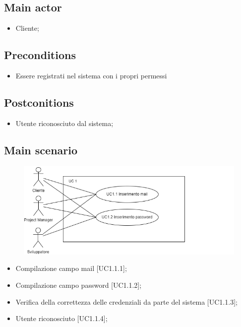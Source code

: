 \documentclass{article}
\begin{document}
     \subsection*{Main actor}
         \begin{itemize}
             \item Cliente;
         \end{itemize}
     \subsection*{Preconditions} 
        \begin{itemize}
            \item Essere registrati nel sistema con i propri permessi
        \end{itemize}
               
    \subsection*{Postconitions}
        \begin{itemize}
            \item Utente riconosciuto dal sistema;
        \end{itemize}
    \subsection*{Main scenario}
        \begin{figure}[h]
            \centering
            \includegraphics{./imgUML/UC1-zoom.png}
            \label{fig:immagine}
        \end{figure}
            
        \begin{itemize}
            \item Compilazione campo mail [UC1.1.1];
            \item Compilazione campo password [UC1.1.2];
            \item Verifica della correttezza delle credenziali da parte del sistema [UC1.1.3];
            \item Utente riconosciuto [UC1.1.4];
        \end{itemize}
            
\end{document}
